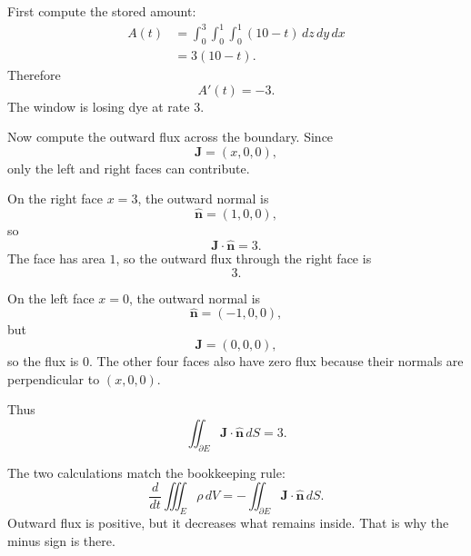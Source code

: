 First compute the stored amount:
\[
\begin{aligned}
A(t)
&=
\int_0^3\int_0^1\int_0^1 (10-t)\,dz\,dy\,dx\\
&=
3(10-t).
\end{aligned}
\]
Therefore
\[
\boxed{
    A'(t)=-3.
}
\]
The window is losing dye at rate \(3\).

Now compute the outward flux across the boundary.  Since
\[
    \mathbf J=(x,0,0),
\]
only the left and right faces can contribute.

On the right face \(x=3\), the outward normal is
\[
    \widehat{\mathbf n}=(1,0,0),
\]
so
\[
    \mathbf J\cdot\widehat{\mathbf n}=3.
\]
The face has area \(1\), so the outward flux through the right face is
\[
    3.
\]

On the left face \(x=0\), the outward normal is
\[
    \widehat{\mathbf n}=(-1,0,0),
\]
but
\[
    \mathbf J=(0,0,0),
\]
so the flux is \(0\).  The other four faces also have zero flux because their normals
are perpendicular to \((x,0,0)\).

Thus
\[
\boxed{
    \iint_{\partial E}\mathbf J\cdot\widehat{\mathbf n}\,dS=3.
}
\]

The two calculations match the bookkeeping rule:
\[
\boxed{
    \frac{d}{dt}\iiint_E \rho\,dV
    =
    -\iint_{\partial E}\mathbf J\cdot\widehat{\mathbf n}\,dS.
}
\]
Outward flux is positive, but it decreases what remains inside.  That is why the minus
sign is there.

